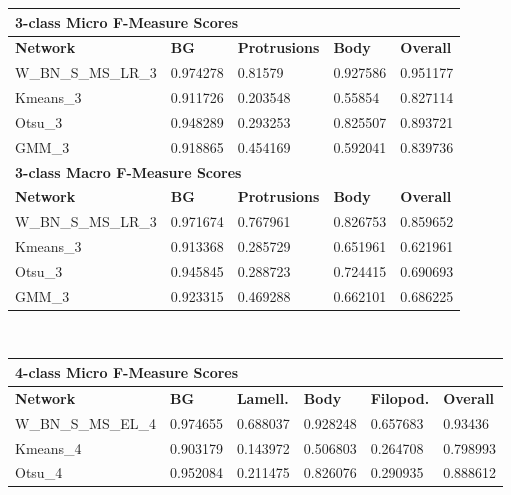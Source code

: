 \begin {table}
	\begin{flushleft}
		\begin {tabular}[!htb]{|l|l|l|l|l|}
			\hline\multicolumn{5}{|l|}{\textbf{3-class Micro F-Measure Scores}} \\ \hline
			\textbf{Network}& \textbf{BG}& \textbf{Protrusions}& \textbf{Body}& \textbf{Overall} \\ \hline
			W\_BN\_S\_MS\_LR\_3& \cellcolor{green!25}0.974278& \cellcolor{green!25}0.81579& \cellcolor{green!25}0.927586& \cellcolor{green!25}0.951177 \\ \hline
			Kmeans\_3& 0.911726& 0.203548& 0.55854& 0.827114 \\ \hline
			Otsu\_3& 0.948289& 0.293253& 0.825507& 0.893721 \\ \hline
			GMM\_3& 0.918865& 0.454169& 0.592041& 0.839736 \\ \hline
			\multicolumn{5}{|l|}{\textbf{3-class Macro F-Measure Scores}} \\ \hline
			\textbf{Network}& \textbf{BG}& \textbf{Protrusions}& \textbf{Body}& \textbf{Overall} \\ \hline
			W\_BN\_S\_MS\_LR\_3& \cellcolor{green!25}0.971674& \cellcolor{green!25}0.767961& \cellcolor{green!25}0.826753& \cellcolor{green!25}0.859652 \\ \hline
			Kmeans\_3& 0.913368& 0.285729& 0.651961& 0.621961 \\ \hline
			Otsu\_3& 0.945845& 0.288723& 0.724415& 0.690693 \\ \hline
			GMM\_3& 0.923315& 0.469288& 0.662101& 0.686225 \\ \hline
		\end {tabular}
		\vspace{0.5cm}\\
		\begin {tabular}[!htb]{|l|l|l|l|l|l|}
			\hline\multicolumn{6}{|l|}{\textbf{4-class Micro F-Measure Scores}} \\ \hline
			\textbf{Network}& \textbf{BG}& \textbf{Lamell.}& \textbf{Body}& \textbf{Filopod.}& \textbf{Overall} \\ \hline
			W\_BN\_S\_MS\_EL\_4& \cellcolor{green!25}0.974655& \cellcolor{green!25}0.688037& \cellcolor{green!25}0.928248& \cellcolor{green!25}0.657683& \cellcolor{green!25}0.93436 \\ \hline
			Kmeans\_4& 0.903179& 0.143972& 0.506803& 0.264708& 0.798993 \\ \hline
			Otsu\_4& 0.952084& 0.211475& 0.826076& 0.290935& 0.888612 \\ \hline

\end{tabular}
\end{flushleft}
\end{table}
